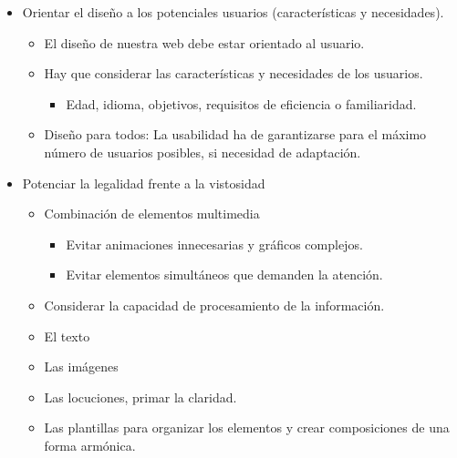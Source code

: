 \documentclass[12pt, twoside, openright]{report} %
\begin{document}
\begin{itemize}
	\item Orientar el diseño a los potenciales usuarios (características y
	      necesidades).

	      \begin{itemize}
		      \item El diseño de nuestra web debe estar orientado al usuario.

		      \item Hay que considerar las características y necesidades de los
		            usuarios.

		            \begin{itemize}
			            \item Edad, idioma, objetivos, requisitos de eficiencia o
			                  familiaridad.
		            \end{itemize}

		      \item Diseño para todos: La usabilidad ha de garantizarse para el máximo
		            número de usuarios posibles, si necesidad de adaptación.
	      \end{itemize}




	\item Potenciar la legalidad frente a la vistosidad
	      \begin{itemize}
		      \item Combinación de elementos multimedia
		            \begin{itemize}
			            \item Evitar animaciones innecesarias y gráficos complejos.

			            \item Evitar elementos simultáneos que demanden la atención.
		            \end{itemize}


		      \item Considerar la capacidad de procesamiento de la información.

		      \item El texto

		      \item Las imágenes

		      \item Las locuciones, primar la claridad.

		      \item Las plantillas para organizar los elementos y crear composiciones de una forma armónica.


\end{itemize}
\end{itemize}
\end{document}
